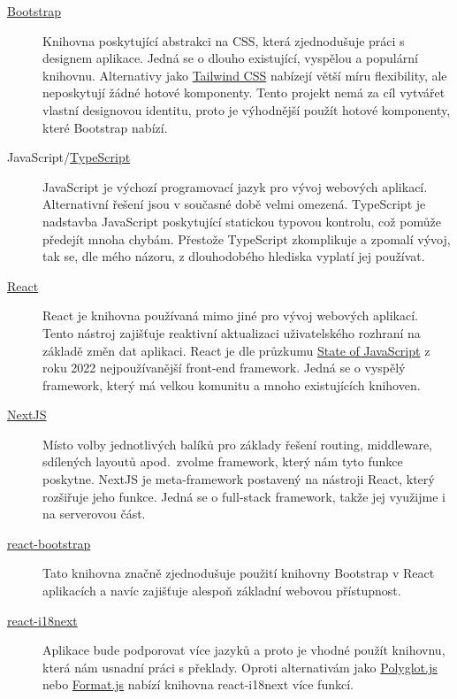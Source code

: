 \begin{description}
    \item[\href{https://getbootstrap.com/}{Bootstrap}]
    Knihovna poskytující abstrakci na CSS, která zjednodušuje práci s designem aplikace.
    Jedná se o dlouho existující, vyspělou a populární knihovnu.
    Alternativy jako \href{https://tailwindcss.com/}{Tailwind CSS} nabízejí větší míru flexibility, ale neposkytují žádné hotové komponenty.
    Tento projekt nemá za cíl vytvářet vlastní designovou identitu, proto je výhodnější použít hotové komponenty, které Bootstrap nabízí.
    \item[JavaScript/\href{https://www.typescriptlang.org/}{TypeScript}]
    JavaScript je výchozí programovací jazyk pro vývoj webových aplikací.
    Alternativní řešení jsou v současné době velmi omezená.
    TypeScript je nadstavba JavaScript poskytující statickou typovou kontrolu, což pomůže předejít mnoha chybám.
    Přestože TypeScript zkomplikuje a zpomalí vývoj, tak se, dle mého názoru, z dlouhodobého hlediska vyplatí jej používat.
    \item[\href{https://react.dev/}{React}]
    React je knihovna používaná mimo jiné pro vývoj webových aplikací.
    Tento nástroj zajišťuje reaktivní aktualizaci uživatelského rozhraní na základě změn dat aplikaci.
    React je dle průzkumu \href{https://2022.stateofjs.com/en-US/libraries/front-end-frameworks/}{State of JavaScript} z roku 2022 nejpoužívanější front-end framework.
    Jedná se o vyspělý framework, který má velkou komunitu a mnoho existujících knihoven.
    \item[\href{https://nextjs.org/}{NextJS}]
    Místo volby jednotlivých balíků pro základy řešení routing, middleware, sdílených layoutů apod.\ zvolme framework, který nám tyto funkce poskytne.
    NextJS je meta-framework postavený na nástroji React, který rozšiřuje jeho funkce.
    Jedná se o full-stack framework, takže jej využijme i na serverovou část.
    \item[\href{https://react-bootstrap.github.io/}{react-bootstrap}]
    Tato knihovna značně zjednodušuje použití knihovny Bootstrap v React aplikacích a navíc zajišťuje alespoň základní webovou přístupnost.
    \item[\href{https://www.npmjs.com/package/react-i18next}{react-i18next}]
    Aplikace bude podporovat více jazyků a proto je vhodné použít knihovnu, která nám usnadní práci s překlady.
    Oproti alternativám jako \href{https://github.com/airbnb/polyglot.js}{Polyglot.js} nebo \href{https://github.com/formatjs/formatjs}{Format.js} nabízí knihovna react-i18next více funkcí.

\end{description}
